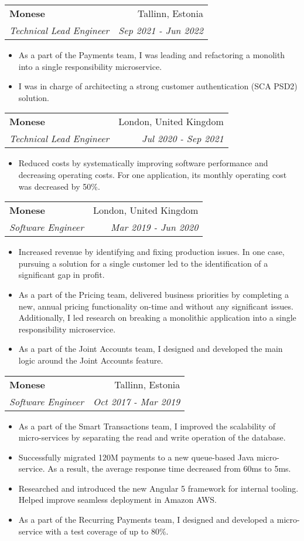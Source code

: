 \documentclass[11pt,a4paper,oneside]{report}
\makeatletter
\newcommand{\resumeItemWithoutTitle}[2]{
    \item\small{
        \textbf{#1}{#2\vspace{-2pt}}
    }
}
\newcommand{\resumeSubheading}[4]{
    \vspace{-1pt}\item
    \begin{tabular*}{0.97\textwidth}[t]{l@{\extracolsep{\fill}}r}
        \textbf{#1} & #2 \\
        \textit{\small#3} & \textit{\small #4} \\
    \end{tabular*}\vspace{-5pt}
}
\newcommand{\resumeSubSubheading}[2]{
    \begin{tabular*}{0.97\textwidth}{l@{\extracolsep{\fill}}r}
        \textit{\small#1} & \textit{\small #2} \\
    \end{tabular*}\vspace{-5pt}
}
\newcommand{\resumeItemListStart}{\begin{itemize}}
\newcommand{\resumeItemListEnd}{\end{itemize}\vspace{-5pt}}
\makeatother
\begin{document}
\resumeSubheading
{Monese}{Tallinn, Estonia}
{Technical Lead Engineer}{Sep 2021 - Jun 2022}
  \resumeItemListStart
    \resumeItemWithoutTitle{}
    {As a part of the Payments team, I was leading and refactoring a monolith into a single responsibility microservice.}
    \resumeItemWithoutTitle{}
    {I was in charge of architecting a strong customer authentication (SCA PSD2) solution.}
  \resumeItemListEnd

\resumeSubheading
{Monese}{London, United Kingdom}
{Technical Lead Engineer}{Jul 2020 - Sep 2021}
    \resumeItemListStart
        \resumeItemWithoutTitle{}
        {Reduced costs by systematically improving software performance and decreasing operating costs. For one application, its monthly operating cost was decreased by 50\%.}
        \resumeItemListEnd

\resumeSubheading
{Monese}{London, United Kingdom}
{Software Engineer}{Mar 2019 - Jun 2020}
    \resumeItemListStart
        \resumeItemWithoutTitle{}
        {Increased revenue by identifying and fixing production issues. In one case, pursuing a solution for a single customer led to the identification of a significant gap in profit.}
        \resumeItemWithoutTitle{}
        {As a part of the Pricing team, delivered business priorities by completing a new, annual pricing functionality on-time and without any significant issues.
        Additionally, I led research on breaking a monolithic application into a single responsibility microservice.}
        \resumeItemWithoutTitle{}
        {As a part of the Joint Accounts team, I designed and developed the main logic around the Joint Accounts feature.}
        \resumeItemListEnd

\resumeSubheading
{Monese}{Tallinn, Estonia}
{Software Engineer}{Oct 2017 - Mar 2019}
  \resumeItemListStart
    \resumeItemWithoutTitle{}
    {As a part of the Smart Transactions team, I improved the scalability of micro-services by separating the read and write operation of the database.}
    \resumeItemWithoutTitle{}
    {Successfully migrated 120M payments to a new queue-based Java micro-service. As a result, the average response time decreased from 60ms to 5ms.}
    \resumeItemWithoutTitle{}
    {Researched and introduced the new Angular 5 framework for internal tooling. Helped improve seamless deployment in Amazon AWS.}
    \resumeItemWithoutTitle{}
    {As a part of the Recurring Payments team, I designed and developed a micro-service with a test coverage of up to 80\%.}
  \resumeItemListEnd
\end{document}

